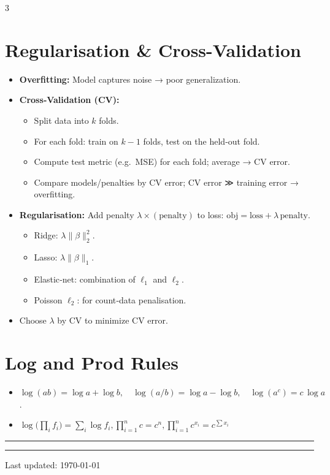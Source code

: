 \documentclass[10pt,landscape]{article}
\begin{document}
\begin{multicols}{3}
\section{Regularisation \& Cross-Validation}
\begin{itemize}
  \item \textbf{Overfitting:} Model captures noise → poor generalization.
  \item \textbf{Cross‐Validation (CV):}
    \begin{itemize}
      \item Split data into $k$ folds.
      \item For each fold: train on $k-1$ folds, test on the held‐out fold.
      \item Compute test metric (e.g.\ MSE) for each fold; average → CV error.
      \item Compare models/penalties by CV error; CV error ≫ training error → overfitting.
    \end{itemize}
  \item \textbf{Regularisation:} Add penalty $\lambda\times(\text{penalty})$ to loss: $\displaystyle \text{obj} = \text{loss} + \lambda\,\text{penalty}.$
    \begin{itemize}
      \item Ridge: $\lambda\|\beta\|_2^2$.
      \item Lasso: $\lambda\|\beta\|_1$.
      \item Elastic‐net: combination of $\ell_1$ and $\ell_2$.
      \item Poisson $\ell_2$: for count‐data penalisation.
    \end{itemize}
  \item Choose $\lambda$ by CV to minimize CV error.
\end{itemize}

\section{Log and Prod Rules}
\begin{itemize}
  \item $\displaystyle \log(ab)=\log a+\log b,\quad \log(a/b)=\log a - \log b,\quad \log(a^c)=c\,\log a$.
  \item $\displaystyle \log\bigl(\prod_i f_i\bigr) = \sum_i \log f_i, \prod_{i=1}^n c = c^n, \prod_{i=1}^n c^{x_i} = c^{\sum x_i}$
\end{itemize}

\vfill\null
\end{multicols}

\vspace{0.2em}
\hrule
\vspace{0.1em}



\vspace{0.2em}
\hrule
\vspace{0.1em}
\begin{center}\scriptsize Last updated: \today\end{center}
\end{document}
